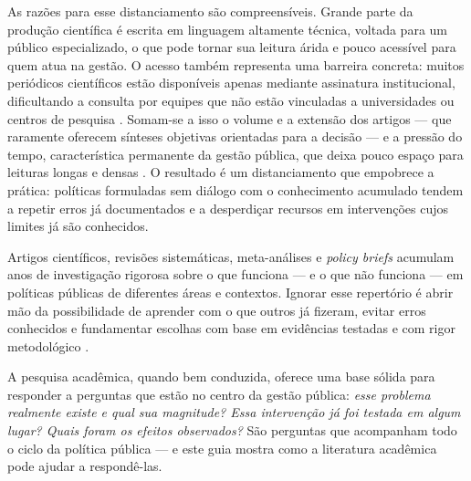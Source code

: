 \documentclass[12pt, a4paper, openany]{book}
\begin{document}
As razões para esse distanciamento são compreensíveis. Grande parte da produção
científica é escrita em linguagem altamente técnica, voltada para um público
especializado, o que pode tornar sua leitura árida e pouco acessível para quem
atua na gestão. O acesso também representa uma barreira concreta: muitos
periódicos científicos estão disponíveis apenas mediante assinatura
institucional, dificultando a consulta por equipes que não estão vinculadas a
universidades ou centros de pesquisa \citep{Oliver2014}. Somam-se a isso o
volume e a extensão dos artigos --- que raramente oferecem sínteses objetivas
orientadas para a decisão --- e a pressão do tempo, característica permanente
da gestão pública, que deixa pouco espaço para leituras longas e densas
\citep{Head2010}. O resultado é um distanciamento que empobrece a prática:
políticas formuladas sem diálogo com o conhecimento acumulado tendem a repetir
erros já documentados e a desperdiçar recursos em intervenções cujos limites já
são conhecidos.

Artigos científicos, revisões sistemáticas, meta-análises e \textit{policy
briefs} acumulam anos de investigação rigorosa sobre o que funciona --- e o que
não funciona --- em políticas públicas de diferentes áreas e contextos. Ignorar
esse repertório é abrir mão da possibilidade de aprender com o que outros já
fizeram, evitar erros conhecidos e fundamentar escolhas com base em evidências
testadas e com rigor metodológico \citep{Nutley2007}.

A pesquisa acadêmica, quando bem conduzida, oferece uma base sólida para
responder a perguntas que estão no centro da gestão pública: \textit{esse
problema realmente existe e qual sua magnitude? Essa intervenção já foi testada
em algum lugar? Quais foram os efeitos observados?} São perguntas que
acompanham todo o ciclo da política pública --- e este guia mostra como a
literatura acadêmica pode ajudar a respondê-las.
\end{document}
